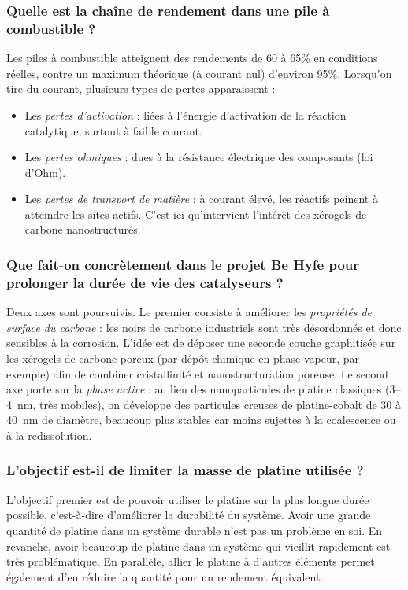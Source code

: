 \subsubsection{Quelle est la chaîne de rendement dans une pile à combustible ?}

Les piles à combustible atteignent des rendements de 60 à 65\% en conditions réelles, contre un maximum théorique (à courant nul) d'environ 95\%. Lorsqu'on tire du courant, plusieurs types de pertes apparaissent :
\begin{itemize}
    \item Les \textit{pertes d'activation} : liées à l'énergie d'activation de la réaction catalytique, surtout à faible courant.
    \item Les \textit{pertes ohmiques} : dues à la résistance électrique des composants (loi d'Ohm).
    \item Les \textit{pertes de transport de matière} : à courant élevé, les réactifs peinent à atteindre les sites actifs. C'est ici qu'intervient l'intérêt des xérogels de carbone nanostructurés.
\end{itemize}

\subsubsection{Que fait-on concrètement dans le projet Be Hyfe pour prolonger la durée de vie des catalyseurs ?}

Deux axes sont poursuivis. Le premier consiste à améliorer les \textit{propriétés de surface du carbone} : les noirs de carbone industriels sont très désordonnés et donc sensibles à la corrosion. L'idée est de déposer une seconde couche graphitisée sur les xérogels de carbone poreux (par dépôt chimique en phase vapeur, par exemple) afin de combiner cristallinité et nanostructuration poreuse. Le second axe porte sur la \textit{phase active} : au lieu des nanoparticules de platine classiques (3--4~nm, très mobiles), on développe des particules creuses de platine-cobalt de 30 à 40~nm de diamètre, beaucoup plus stables car moins sujettes à la coalescence ou à la redissolution.

\subsubsection{L'objectif est-il de limiter la masse de platine utilisée ?}

L'objectif premier est de pouvoir utiliser le platine sur la plus longue durée possible, c'est-à-dire d'améliorer la durabilité du système. Avoir une grande quantité de platine dans un système durable n'est pas un problème en soi. En revanche, avoir beaucoup de platine dans un système qui vieillit rapidement est très problématique. En parallèle, allier le platine à d'autres éléments permet également d'en réduire la quantité pour un rendement équivalent.

